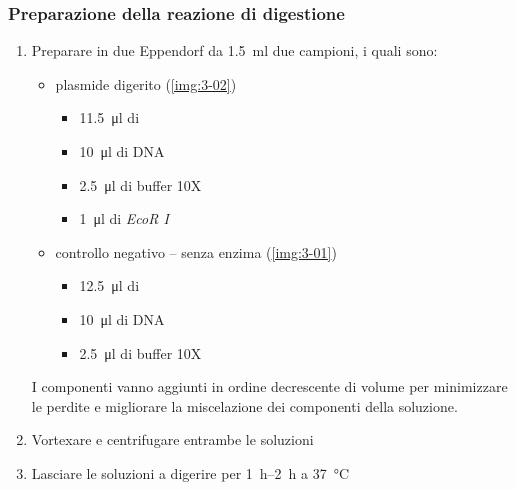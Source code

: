 \subsubsection{Preparazione della reazione di digestione}
\begin{enumerate}
	\item Preparare in due \foreignlanguage{german}{Eppendorf} da \qty{1.5}{\ml} due campioni, i quali sono:
	\begin{itemize}
		\item plasmide digerito (\autoref{img:3-02})
		\begin{itemize}
			\item \qty{11.5}{\micro\litre} di 
			\item \qty{10}{\micro\litre} di DNA
			\item \qty{2.5}{\micro\litre} di buffer 10X
			\item \qty{1}{\micro\litre} di \emph{EcoR I}
		\end{itemize}
		\item controllo negativo -- senza enzima (\autoref{img:3-01})
		\begin{itemize}
			\item \qty{12.5}{\micro\litre} di 
			\item \qty{10}{\micro\litre} di DNA
			\item \qty{2.5}{\micro\litre} di buffer 10X
		\end{itemize}
	\end{itemize}
	\begin{Note}
		I componenti vanno aggiunti in ordine decrescente di volume per minimizzare le perdite e migliorare la miscelazione dei componenti della soluzione.
	\end{Note}
	\item Vortexare e centrifugare entrambe le soluzioni
	\item Lasciare le soluzioni a digerire per \qtyrange{1}{2}{\hour} a \qty{37}{\celsius}
\end{enumerate}

